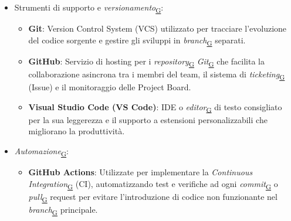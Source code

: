 \documentclass[a4paper,12pt]{article}
\begin{document}
{{{{\begin{itemize}
                    \item Strumenti di supporto e \textit{versionamento}\textsubscript{\href{https://atlasteam9.github.io/Atlas/glossario.html\#Versionamento}{G}}:
                    \begin{itemize}
                        \item \textbf{Git}: Version Control System (VCS) utilizzato per tracciare l'evoluzione del codice sorgente e gestire gli sviluppi in \textit{branch}\textsubscript{\href{https://atlasteam9.github.io/Atlas/glossario.html\#Branch}{G}} separati.
                        \item \textbf{GitHub}: Servizio di hosting per i \textit{repository}\textsubscript{\href{https://atlasteam9.github.io/Atlas/glossario.html\#Repository}{G}} \textit{Git}\textsubscript{\href{https://atlasteam9.github.io/Atlas/glossario.html\#Git}{G}} che facilita la collaborazione asincrona tra i membri del team, il sistema di \textit{ticketing}\textsubscript{\href{https://atlasteam9.github.io/Atlas/glossario.html\#Ticketing}{G}} (Issue) e il monitoraggio delle Project Board.
                        \item \textbf{Visual Studio Code (VS Code)}: IDE o \textit{editor}\textsubscript{\href{https://atlasteam9.github.io/Atlas/glossario.html\#Editor}{G}} di testo consigliato per la sua leggerezza e il supporto a estensioni personalizzabili che migliorano la produttività.
                    \end{itemize}
                    
                    \item \textit{Automazione}\textsubscript{\href{https://atlasteam9.github.io/Atlas/glossario.html\#Automazione}{G}}:
                    \begin{itemize}
                        \item \textbf{GitHub Actions}: Utilizzate per implementare la \textit{Continuous Integration}\textsubscript{\href{https://atlasteam9.github.io/Atlas/glossario.html\#ContinuousIntegration}{G}} (CI), automatizzando test e verifiche ad ogni \textit{commit}\textsubscript{\href{https://atlasteam9.github.io/Atlas/glossario.html\#Commit}{G}} o \textit{pull}\textsubscript{\href{https://atlasteam9.github.io/Atlas/glossario.html\#Pull}{G}} request per evitare l'introduzione di codice non funzionante nel \textit{branch}\textsubscript{\href{https://atlasteam9.github.io/Atlas/glossario.html\#Branch}{G}} principale.
                    \end{itemize}
                \end{itemize}
                
            }
        }
    }
}
\end{document}
